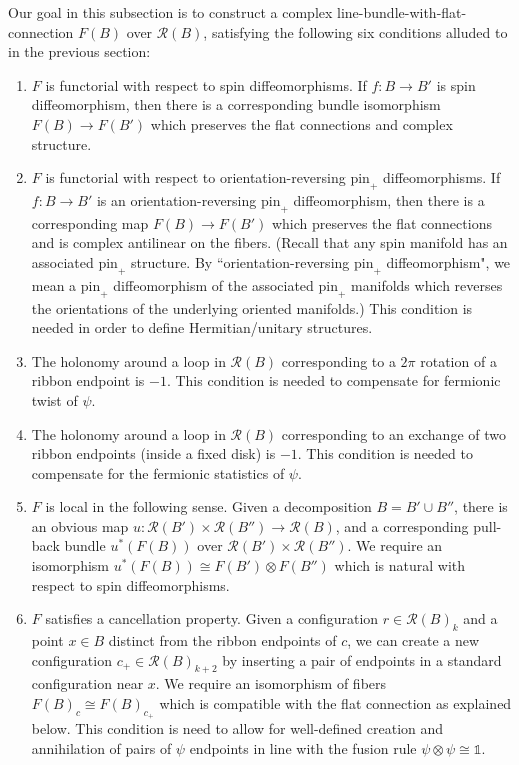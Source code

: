 \documentclass[12pt,a4paper]{article}
\newcommand{\tp}{\otimes}
\newcommand{\unit}{\mathds{1}}
\newcommand{\mcr}{\mathcal{R}}
\begin{document}
Our goal in this subsection is to construct a complex line-bundle-with-flat-connection $F(B)$ over $\mcr(B)$,
satisfying the following six conditions alluded to in the previous section:
\begin{enumerate}
\item $F$ is functorial with respect to spin diffeomorphisms.  
If $f: B \to B'$ is spin diffeomorphism, then there is a corresponding bundle isomorphism $F(B) \to F(B')$ which
preserves the flat connections and complex structure.
\item $F$ is functorial with respect to orientation-reversing $\mbox{pin}_+$ diffeomorphisms. 
If $f: B \to B'$ is an orientation-reversing $\mbox{pin}_+$ diffeomorphism, then there is a corresponding map
$F(B) \to F(B')$ which preserves the flat connections and is complex antilinear on the fibers.
(Recall that any spin manifold has an associated $\mbox{pin}_+$ structure.
By ``orientation-reversing $\mbox{pin}_+$ diffeomorphism", we mean a $\mbox{pin}_+$ diffeomorphism
of the associated $\mbox{pin}_+$ manifolds which reverses the orientations of the underlying oriented manifolds.)
This condition is needed in order to define Hermitian/unitary structures.
\item The holonomy around a loop in $\mcr(B)$ corresponding to a $2\pi$ rotation of a ribbon endpoint is $-1$.
This condition is needed to compensate for fermionic twist of $\psi$.
\item The holonomy around a loop in $\mcr(B)$ corresponding to an exchange of two ribbon endpoints 
(inside a fixed disk) is $-1$.
This condition is needed to compensate for the fermionic statistics of $\psi$.
\item $F$ is local in the following sense.
Given a decomposition $B = B'\cup B''$, there is an obvious map $u: \mcr(B')\times\mcr(B'')\to\mcr(B)$, 
and a corresponding pull-back bundle $u^*(F(B))$ over $\mcr(B')\times\mcr(B'')$.
We require an isomorphism $u^*(F(B)) \cong F(B')\otimes F(B'')$ which is natural with respect to spin diffeomorphisms.
\item $F$ satisfies a cancellation property.
Given a configuration $r \in \mcr(B)_k$ and a point $x\in B$ distinct from the ribbon endpoints of $c$,
we can create a new configuration $c_+ \in \mcr(B)_{k+2}$ by inserting a pair of endpoints in a standard configuration
near $x$.
We require an isomorphism of fibers $F(B)_c \cong F(B)_{c_+}$ which is compatible with the flat connection as explained below.
This condition is need to allow for well-defined creation and annihilation of pairs of $\psi$ endpoints in line with the fusion rule $\psi \tp \psi \cong \unit$.
\end{enumerate}
\end{document}
